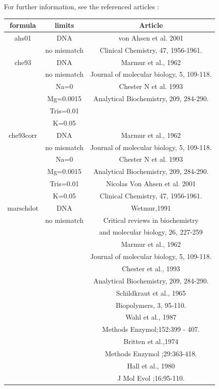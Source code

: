 \documentclass{article}
\begin{document}
For further information, see the referenced articles :
\begin{table}[hc]
\begin{tabular}[h]{| c | c | c |}
\textbf{formula} & \textbf{limits} & \textbf{Article} \\ 
\hline
ahs01 & DNA & von Ahsen et al. 2001\\
 & no mismatch & Clinical Chemistry, 47, 1956-1961. \\
 \hline
che93 & DNA & Marmur et al., 1962\\
 & no mismatch & Journal of molecular biology, 5, 109-118. \\
 & Na=0 & Chester N et al. 1993\\
 & Mg=0.0015 & Analytical Biochemistry, 209, 284-290. \\
 & Tris=0.01 & \\ 
 & K=0.05 & \\
 \hline
che93corr & DNA & Marmur et al., 1962\\
 & no mismatch & Journal of molecular biology, 5, 109-118. \\
 & Na=0 & Chester N et al. 1993\\
 & Mg=0.0015 & Analytical Biochemistry, 209, 284-290. \\
 & Tris=0.01 & Nicolas Von Ahsen et al. 2001\\
 & K=0.05 & Clinical Chemistry, 47, 1956-1961. \\
 \hline
marschdot & DNA & Wetmur,1991\\
 & no mismatch & Critical reviews in biochemistry \\
 & & and molecular biology, 26, 227-259 \\
 & & Marmur et al., 1962\\
 & & Journal of molecular biology, 5, 109-118. \\
 & & Chester et al., 1993\\
 & & Analytical Biochemistry, 209, 284-290. \\
 & & Schildkraut et al., 1965\\
 & & Biopolymers, 3, 95-110. \\
 & & Wahl et al., 1987\\
 & & Methods Enzymol;152:399 - 407. \\
 & & Britten et al.,1974\\
 & & Methods Enzymol ;29:363-418. \\
 & & Hall et al., 1980\\
 & & J Mol Evol ;16:95-110.\\

\end{tabular}
\end{table}
\end{document}
